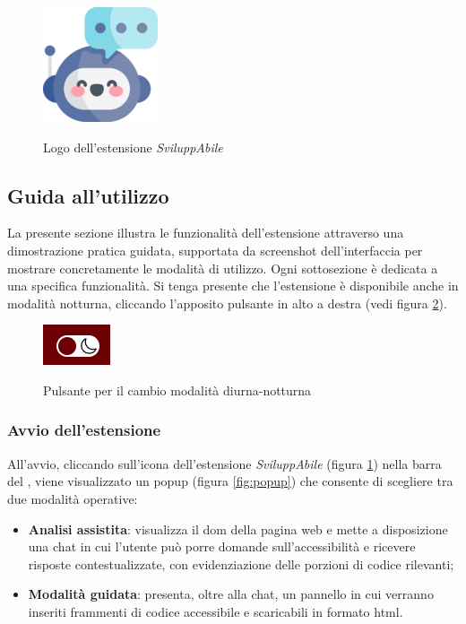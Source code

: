 \begin{figure}[H]
    \centering
    \includegraphics[width=0.15\linewidth, alt={Logo dell'estensione \textit{SviluppAbile}}]{img/sviluppabile.png}
    \caption{Logo dell'estensione \textit{SviluppAbile}}\label{fig:logo_sviluppabile}
\end{figure}

\subsection{Guida all'utilizzo}
\noindent La presente sezione illustra le funzionalità dell’estensione attraverso una dimostrazione pratica guidata, supportata da screenshot dell’interfaccia per mostrare concretamente le modalità di utilizzo. Ogni sottosezione è dedicata a una specifica funzionalità. Si tenga presente che l'estensione è disponibile anche in modalità notturna, cliccando l'apposito pulsante in alto a destra (vedi figura \ref{fig:notte}).
\begin{figure}[H]
    \centering
    \includegraphics[width=0.1\linewidth, alt={Pulsante per il cambio modalità diurna-notturna}]{img/toggletheme.png}
    \caption{Pulsante per il cambio modalità diurna-notturna}\label{fig:notte}
\end{figure}


\subsubsection{Avvio dell'estensione}
\noindent All’avvio, cliccando sull’icona dell’estensione \textit{SviluppAbile} (figura \ref{fig:logo_sviluppabile}) nella barra del , viene visualizzato un popup (figura \ref{fig:popup}) che consente di scegliere tra due modalità operative:
\begin{itemize}
  \item \textbf{Analisi assistita}: visualizza il \acrshort{dom} della pagina web e mette a disposizione una chat in cui l’utente può porre domande sull’accessibilità e ricevere risposte contestualizzate, con evidenziazione delle porzioni di codice rilevanti; 
  \item \textbf{Modalità guidata}: presenta, oltre alla chat, un pannello in cui verranno inseriti frammenti di codice accessibile e scaricabili in formato \acrshort{html}.
\end{itemize}

